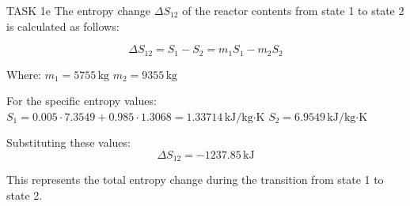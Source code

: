 TASK 1e  
The entropy change \( \Delta S_{12} \) of the reactor contents from state 1 to state 2 is calculated as follows:

\[
\Delta S_{12} = S_1 - S_2 = m_1 S_1 - m_2 S_2
\]

Where:  
\( m_1 = 5755 \, \text{kg} \)  
\( m_2 = 9355 \, \text{kg} \)  

For the specific entropy values:  
\( S_1 = 0.005 \cdot 7.3549 + 0.985 \cdot 1.3068 = 1.33714 \, \text{kJ/kg·K} \)  
\( S_2 = 6.9549 \, \text{kJ/kg·K} \)  

Substituting these values:  
\[
\Delta S_{12} = -1237.85 \, \text{kJ}
\]  

This represents the total entropy change during the transition from state 1 to state 2.